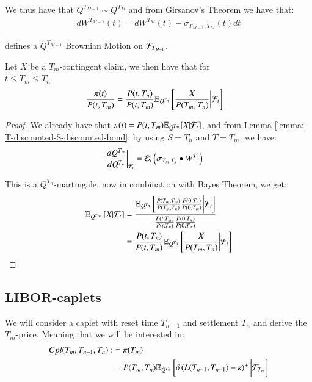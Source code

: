 We thus have that $Q^{T_{M-1}} \sim Q^{T_{M}}$ and from Girsanov's Theorem we have that: 
\begin{align*}
dW^{T_{M-1}}(t) = dW^{T_{M}}(t) - \sigma_{T_{M-1}, T_{M}}(t)dt   
\end{align*}

defines a $Q^{T_{M-1}}$ Brownian Motion on $\mathcal{F}_{T_{M-1}}$. 

\begin{lemma}
Let $X$ be a $T_{m}$-contingent claim, we then have that for \\ $t\leq T_{m} \leq T_{n}$ 
\begin{align*}
\frac{\pi(t)}{P(t,T_{m})} 
&= 
\frac{
P(t,T_{n})
}{
P(t,T_{m})
}\mathbb{E}_{Q^{T_{n}}}\left[
\frac{X}{P(T_{m}, T_{n})}
\bigg{|}\mathcal{F}_{t}
\right]
\end{align*}
\end{lemma} 

\begin{proof}
We already have that $\pi(t) = P(t,T_{m})\mathbb{E}_{Q^{T_{m}}}[X|\mathcal{F}_{t}]$, and from 
Lemma \ref{lemma: T-discounted-S-discounted-bond}, by using $S = T_{n}$ and $T = T_{m}$, we have:
\begin{align*}
\frac{
dQ^{T_{m}}
}{
dQ^{T_{n}}
}\bigg{|}_{\mathcal{F}_{t}}
&= 
\mathcal{E}_{t}\left(
\sigma_{T_{m}, T_{n}}\bullet W^{T_{n}}
\right)
\end{align*}

This is a $Q^{T_{n}}$-martingale, now in combination with Bayes Theorem, we get: 
\begin{align*}
\mathbb{E}_{Q^{T_{m}}}\left[
X|\mathcal{F}_{t}
\right]
&= 
\frac{
\mathbb{E}_{Q^{T_{n}}}\left[
\frac{P(T_{m}, T_{m})}{P(T_{m}, T_{n})}
\frac{P(0, T_{n})}{P(0, T_{m})}
\bigg{|}\mathcal{F}_{t}\right]
}{
\frac{P(t, T_{m})}{P(t, T_{n})}
\frac{P(0, T_{n})}{P(0, T_{m})}
} \\ 
&= 
\frac{P(t, T_{n})}{P(t, T_{m})}
\mathbb{E}_{Q^{T_{n}}}\left[
\frac{X}{P(T_{m}, T_{n})}
\bigg{|}\mathcal{F}_{t}\right]
\end{align*}

\end{proof} 

\newpage 

\subsection{LIBOR-caplets}

We will consider a caplet with reset time $T_{n-1}$ and settlement $T_{n}$ and derive the $T_{m}$-price. Meaning that we will be interested in: 
\begin{align*}
Cpl(T_{m}, T_{n-1}, T_{n}) :&= \pi(T_{m}) \\ 
&= 
P(T_{m}, T_{n})\mathbb{E}_{Q^{T_{n}}}\left[
\delta\left(
L(T_{n-1}, T_{n-1}) -\kappa
\right)^{+}
\bigg{|}\mathcal{F}_{T_{m}}
\right]
\end{align*}

